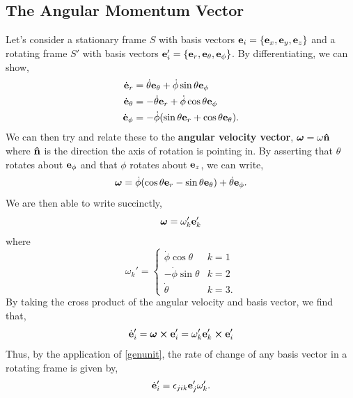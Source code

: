 \documentclass{book}
\begin{document}
 \subsection{The Angular Momentum Vector}
Let's consider a stationary frame $S$ with basis vectors $\vb{e}_i = \left\{\vb{e}_x,\vb{e}_y,\vb{e}_z\right\}$ and a rotating frame $S'$ with basis vectors $\vb{e}_i' = \{\vb{e}_r,\vb{e}_{\theta},\vb{e}_{\phi}\}$. By differentiating, we can show,
\begin{align}
    \Dot{\vb{e}}_r &= \Dot{\theta}\vb{e}_{\theta} + \Dot{\phi}\sin\theta\vb{e}_{\phi} \\ 
    \Dot{\vb{e}}_{\theta} &= -\Dot{\theta}\vb{e}_r + \Dot{\phi}\cos\theta\vb{e}_{\phi} \\
    \Dot{\vb{e}}_{\phi} &= -\Dot{\phi}(\sin\theta\vb{e}_r + \cos\theta\vb{e}_{\theta}).
\end{align}
We can then try and relate these to the \textbf{angular velocity vector}, $\vb*{\omega} = \omega\vu{n}$ where $\vu{n}$ is the direction the axis of rotation is pointing in. By asserting that $\theta$ rotates about $\vb{e}_{\phi}$ and that $\phi$ rotates about $\vb{e}_z$, we can write,
\begin{equation}\label{derivativeofbasis}
    \vb*{\omega} = \Dot{\phi}(\cos\theta\vb{e}_r - \sin\theta\vb{e}_\theta) + \Dot{\theta}\vb{e}_{\phi}.
\end{equation}
We are then able to write succinctly,
\begin{equation}
    \vb*{\omega} = \omega_k'\vb{e}_k'
\end{equation}
where
\begin{equation}
    \omega_k' = 
    \begin{cases}
        \Dot{\phi}\cos\theta & k = 1 \\
        -\Dot{\phi}\sin\theta & k = 2 \\
        \Dot{\theta} & k = 3.
    \end{cases}
\end{equation}
By taking the cross product of the angular velocity and basis vector, we find that,
\begin{equation}
    \Dot{\vb{e}}_i' = \vb*{\omega}\cross\vb{e}_i' = \omega_k'\vb{e}_k' \cross \vb{e}_i'
\end{equation}
Thus, by the application of \eqref{genunit}, the rate of change of any basis vector in a rotating frame is given by,
\begin{equation}
    \Dot{\vb{e}}_i' = \epsilon_{jik}\vb{e}_j'\omega_k'.
\end{equation}
\end{document}
